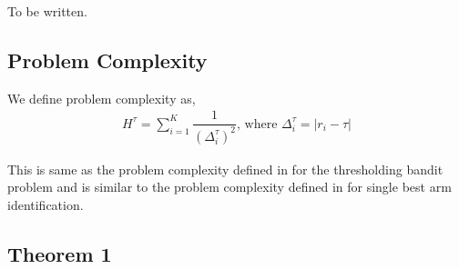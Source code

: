 To be written.

\subsection{Problem Complexity}

We define problem complexity as,
\begin{align*}
H^{\tau} = \sum_{i=1}^{K}\dfrac{1}{(\Delta_{i}^{\tau})^{2}} \text{, where } \Delta_{i}^{\tau}=|r_{i}-\tau|
\end{align*}

This is same as the problem complexity defined in \cite{locatelli2016optimal} for the thresholding bandit problem and is similar to the problem complexity defined in \cite{audibert2010best} for single best arm identification.

\subsection{Theorem 1}

